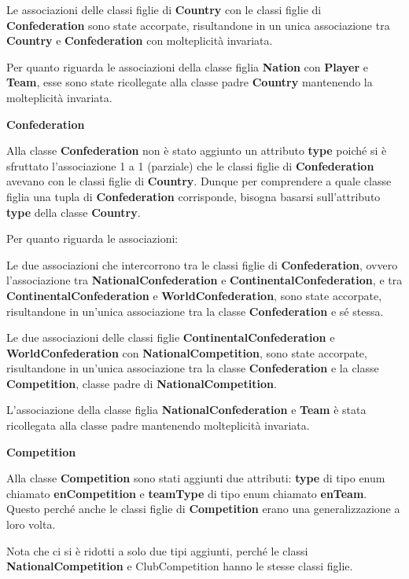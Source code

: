 Le associazioni delle classi figlie di \textbf{Country} con 
le classi figlie di \textbf{Confederation} sono state 
accorpate, risultandone in un unica associazione tra 
\textbf{Country} e \textbf{Confederation} con molteplicità 
invariata.

Per quanto riguarda le associazioni della classe figlia 
\textbf{Nation} con \textbf{Player} e \textbf{Team}, esse 
sono state ricollegate alla classe padre \textbf{Country} 
mantenendo la molteplicità invariata.

\bigskip
\textbf{Confederation}
\bigskip

Alla classe \textbf{Confederation}  non è stato aggiunto un 
attributo \textbf{type} poiché si è sfruttato l'associazione 
1 a 1 (parziale) che le classi figlie di \textbf{Confederation}
avevano con le classi figlie di \textbf{Country}.
Dunque per comprendere a quale classe figlia una tupla di 
\textbf{Confederation} corrisponde, bisogna basarsi 
sull'attributo \textbf{type} della classe \textbf{Country}.

Per quanto riguarda le associazioni:

Le due associazioni che intercorrono tra le classi figlie di 
\textbf{Confederation}, ovvero l'associazione tra 
\textbf{NationalConfederation} e 
\textbf{ContinentalConfederation}, e tra 
\textbf{ContinentalConfederation} e 
\textbf{WorldConfederation}, sono state accorpate, 
risultandone in un'unica associazione tra la classe 
\textbf{Confederation} e sé stessa.

Le due associazioni delle classi figlie 
\textbf{ContinentalConfederation} e 
\textbf{WorldConfederation} con \textbf{NationalCompetition}, 
sono state accorpate, risultandone in un'unica associazione 
tra la classe \textbf{Confederation} e la classe 
\textbf{Competition}, classe padre di 
\textbf{NationalCompetition}.

L'associazione della classe figlia \textbf{NationalConfederation} e
\textbf{Team} è stata ricollegata alla classe padre mantenendo
molteplicità invariata.

\newpage
\textbf{Competition}
\bigskip

Alla classe \textbf{Competition} sono stati aggiunti due 
attributi: \textbf{type} di tipo enum chiamato 
\textbf{enCompetition} e \textbf{teamType} di tipo enum 
chiamato \textbf{enTeam}. Questo perché anche le classi 
figlie di \textbf{Competition} erano una generalizzazione a 
loro volta.

Nota che ci si è ridotti a solo due tipi aggiunti, perché le 
classi \textbf{NationalCompetition} e {ClubCompetition} hanno 
le stesse classi figlie.

